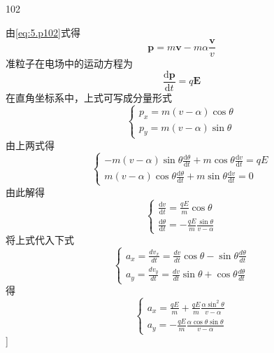 \begin{solution}{102}
\begin{subsolution}
        由\eqref{eq:5.p102}式得
        \begin{equation*}
            \boldsymbol {p} = m \boldsymbol {v} - m \alpha \frac {\boldsymbol {v}}{v}
        \end{equation*}
        准粒子在电场中的运动方程为
        \begin{equation*}
            \frac {\mathrm{d} \boldsymbol {p}}{\mathrm{d} t} = q \boldsymbol {E}
        \end{equation*}
        在直角坐标系中，上式可写成分量形式
        \begin{equation*}
            \left\{ \begin{array}{l} p _ {x} = m (v - \alpha) \cos \theta \\ p _ {y} = m (v - \alpha) \sin \theta \end{array} \right.
        \end{equation*}
        由上两式得
        \begin{equation*}
            \left\{ \begin{array}{l} - m (v - \alpha) \sin \theta \frac {\mathrm{d} \theta}{\mathrm{d} t} + m \cos \theta \frac {\mathrm{d} v}{\mathrm{d} t} = q E \\ m (v - \alpha) \cos \theta \frac {\mathrm{d} \theta}{\mathrm{d} t} + m \sin \theta \frac {\mathrm{d} v}{\mathrm{d} t} = 0 \end{array} \right.
        \end{equation*}
        由此解得
        \begin{equation*}
            \left\{ \begin{array}{l} \frac {\mathrm{d} v}{\mathrm{d} t} = \frac {q E}{m} \cos \theta \\ \frac {\mathrm{d} \theta}{\mathrm{d} t} = - \frac {q E}{m} \frac {\sin \theta}{v - \alpha} \end{array} \right.
        \end{equation*}
        将上式代入下式
        \begin{equation*}
            \left\{ \begin{array}{l} a _ {x} = \frac {d v _ {x}}{d t} = \frac {d v}{d t} \cos \theta - \sin \theta \frac {d \theta}{d t} \\ a _ {y} = \frac {d v _ {y}}{d t} = \frac {d v}{d t} \sin \theta + \cos \theta \frac {d \theta}{d t} \end{array} \right.
        \end{equation*}
        得
        \begin{equation*}
            \left\{ \begin{array}{l} a _ {x} = \frac {q E}{m} + \frac {q E}{m} \frac {\alpha \sin^ {2} \theta}{v - \alpha} \\ a _ {y} = - \frac {q E}{m} \frac {\alpha \cos \theta \sin \theta}{v - \alpha} \end{array} \right.
        \end{equation*}
        ]
    \end{subsolution}
\end{solution}